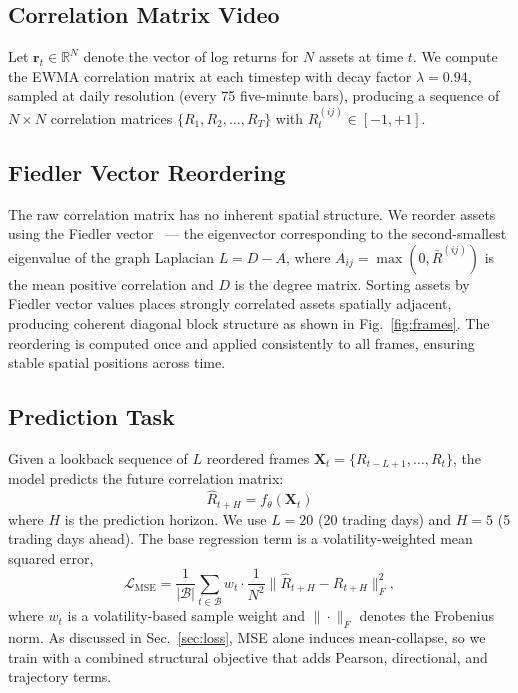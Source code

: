 \documentclass[runningheads]{llncs}
\begin{document}
\subsection{Correlation Matrix Video}

Let $\mathbf{r}_t \in \mathbb{R}^N$ denote the vector of log returns for
$N$ assets at time $t$. We compute the EWMA correlation matrix at each
timestep with decay factor $\lambda = 0.94$, sampled at daily resolution
(every 75 five-minute bars), producing a sequence of $N \times N$
correlation matrices $\{R_1, R_2, \ldots, R_T\}$ with $R_t^{(ij)} \in
[-1, +1]$.

\subsection{Fiedler Vector Reordering}

The raw correlation matrix has no inherent spatial structure. We reorder
assets using the Fiedler vector~\cite{fiedler1973algebraic} --- the
eigenvector corresponding to the second-smallest eigenvalue of the graph
Laplacian $L = D - A$, where $A_{ij} = \max(0, \bar{R}^{(ij)})$ is the
mean positive correlation and $D$ is the degree matrix. Sorting assets by
Fiedler vector values places strongly correlated assets spatially adjacent,
producing coherent diagonal block structure as shown in
Fig.~\ref{fig:frames}. The reordering is computed once and applied
consistently to all frames, ensuring stable spatial positions across time.

\subsection{Prediction Task}

Given a lookback sequence of $L$ reordered frames $\mathbf{X}_t =
\{R_{t-L+1}, \ldots, R_t\}$, the model predicts the future correlation
matrix:
\begin{equation}
    \hat{R}_{t+H} = f_\theta(\mathbf{X}_t)
\end{equation}
where $H$ is the prediction horizon. We use $L = 20$ (20 trading days)
and $H = 5$ (5 trading days ahead). The base regression term is a
volatility-weighted mean squared error,
\begin{equation}
    \mathcal{L}_{\text{MSE}} = \frac{1}{|\mathcal{B}|}
    \sum_{t \in \mathcal{B}} w_t \cdot
    \frac{1}{N^2} \| \hat{R}_{t+H} - R_{t+H} \|_F^2,
\end{equation}
where $w_t$ is a volatility-based sample weight and $\|\cdot\|_F$ denotes
the Frobenius norm. As discussed in Sec.~\ref{sec:loss}, MSE alone
induces mean-collapse, so we train with a combined structural objective
that adds Pearson, directional, and trajectory terms.
\end{document}
